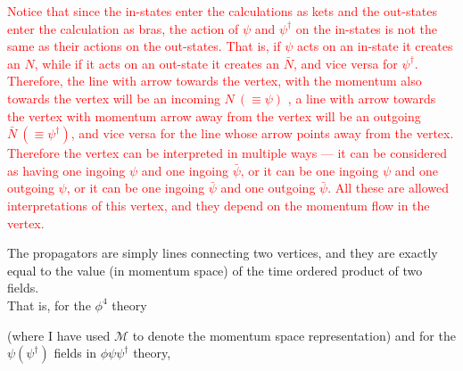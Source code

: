 \documentclass[11pt, notitlepage]{report}
\numberwithin{equation}{section}
\begin{document}
    \textcolor{red}{
        Notice that since the in-states enter the calculations as kets and the out-states enter the calculation as bras, the action of \(\psi\) and \(\psi^\dagger\) on the in-states is not the same as their actions on the out-states. That is, if \(\psi\) acts on an in-state it creates an \(N\), while if it acts on an out-state it creates an \(\bar N\), and vice versa for \(\psi^\dagger\). Therefore, the line with arrow towards the vertex, with the momentum also towards the vertex will be an incoming \(N~(\equiv \psi)\) , a line with arrow towards the vertex with momentum arrow away from the vertex will be an outgoing \(\bar N ~(\equiv \psi^\dagger)\), and vice versa for the line whose arrow points away from the vertex.\vspace{7pt}\\
        Therefore the vertex can be interpreted in multiple ways — it can be considered as having one ingoing \(\psi\) and one ingoing \(\bar{\psi}\), or it can be one ingoing \(\psi\) and one outgoing \(\psi\), or it can be one ingoing \(\bar{\psi}\) and one outgoing \(\bar{\psi}\). All these are allowed interpretations of this vertex, and they depend on the momentum flow in the vertex.\\
    }

    The propagators are simply lines connecting two vertices, and they are exactly equal to the value (in momentum space) of the time ordered product of two fields. \\
    That is, for the \(\phi^4\) theory 

    \begin{figure}[h]
        \centering
    \end{figure}

    (where I have used \(\mathcal{M}\) to denote the momentum space representation) and for the \(\psi(\psi^\dagger)\) fields in \(\phi\psi\psi^\dagger\) theory, 
    \begin{figure}[h]
        \centering
    \end{figure}
\end{document}
